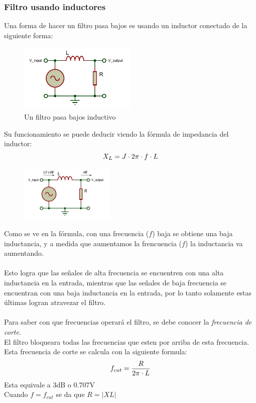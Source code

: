 \documentclass[../main.tex]{subfiles}
\begin{document}
	
		\clearpage
		\subsubsection{Filtro usando inductores}
		Una forma de hacer un filtro pasa bajos es usando un inductor conectado 
		de la siguiente forma:
		\begin{figure}[H]
			\centering
			\includegraphics[width=0.5\textwidth]{filtros/pasa-bajo_ind1.pdf}
			\caption{Un filtro pasa bajos inductivo}
		\end{figure}
		Su funcionamiento se puede deducir viendo la fórmula de impedancia del inductor:
		\[
			X_L =J \cdot 2\pi \cdot f \cdot L
		\]
		\begin{figure}
			\centering
			\includegraphics[width=0.4\textwidth]{filtros/pasa-bajo_ind2.pdf}
			\caption{}
		\end{figure}
		Como se ve en la fórmula, con una frecuencia ($f$) baja se obtiene una baja 
		inductancia, y a medida que aumentamos la frencuencia ($f$) la inductancia 
		va aumentando.\\\\
		Esto logra que las señales de alta frecuencia se encuentren con una alta inductancia
		en la entrada, mientras que las señales de baja frecuencia se encuentran con 
		una baja inductancia en la entrada, por lo tanto solamente estas últimas logran
		atravezar el filtro.\\\\
		Para saber con que frecuencias operará el filtro, se debe conocer la
		\emph{frecuencia de corte}.\\
		El filtro bloqueara todas las frecuencias que esten por arriba
		de esta frecuencia.\\
		Esta frecuencia de corte se calcula con la siguiente formula:
		\[
			f_{cut} = \dfrac{R}{2\pi \cdot L}
		\]
		Esta equivale a 3dB o 0.707V\\
		Cuando $f = f_{cut}$ se da que $R = \left | XL \right |$
\end{document}
